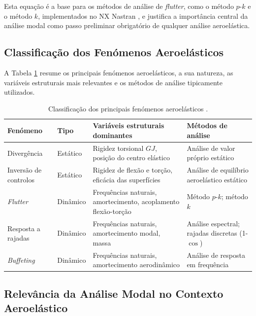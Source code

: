 \documentclass[11pt,oneside,a4paper,final]{report}
\begin{document}
Esta equação é a base para os métodos de análise de \textit{flutter}, como o método $p$-$k$ e o método $k$, implementados no NX Nastran \cite{Nastran2014}, e justifica a importância central da análise modal como passo preliminar obrigatório de qualquer análise aeroelástica.

\subsection{Classificação dos Fenómenos Aeroelásticos}

A Tabela \ref{tab:fenomenos_aero} resume os principais fenómenos aeroelásticos, a sua natureza, as variáveis estruturais mais relevantes e os métodos de análise tipicamente utilizados.

\begin{table}[H]
\centering
\caption{Classificação dos principais fenómenos aeroelásticos \cite{Wright2015, Dowell2004}.}
\label{tab:fenomenos_aero}
\renewcommand{\arraystretch}{1.8} %
\begin{tabularx}{\textwidth}{
    >{\raggedright\arraybackslash}p{2.4cm} %
    >{\raggedright\arraybackslash}p{1.8cm} %
    >{\raggedright\arraybackslash}X 
    >{\raggedright\arraybackslash}X
}
\toprule
\textbf{Fenómeno} & \textbf{Tipo} & \textbf{Variáveis estruturais dominantes} & \textbf{Métodos de análise} \\
\midrule
Divergência & Estático & Rigidez torsional $GJ$, posição do centro elástico & Análise de valor próprio estático \\
Inversão de controlos & Estático & Rigidez de flexão e torção, eficácia das superfícies & Análise de equilíbrio aeroelástico estático \\
\textit{Flutter} & Dinâmico & Frequências naturais, amortecimento, acoplamento flexão-torção & Método $p$-$k$; método $k$ \\
Resposta a rajadas & Dinâmico & Frequências naturais, amortecimento modal, massa & Análise espectral; rajadas discretas (1-$\cos$) \\
\textit{Buffeting} & Dinâmico & Frequências naturais, amortecimento aerodinâmico & Análise de resposta em frequência \\
\bottomrule
\end{tabularx}
\end{table}

\subsection{Relevância da Análise Modal no Contexto 
Aeroelástico}
\end{document}
